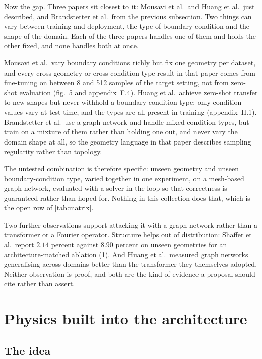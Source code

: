 \documentclass[11pt, a4paper]{article}
\begin{document}
Now the gap. Three papers sit closest to it: Mousavi et al.\ and Huang
et al.\ just described, and Brandstetter et al.\ from the previous
subsection. Two things can vary between training and deployment, the type of
boundary condition and the shape of the domain. Each of the three papers
handles one of them and holds the other fixed, and none handles both at once.

Mousavi et al.\ vary boundary conditions richly but fix one geometry per
dataset, and every cross-geometry or cross-condition-type result in that paper
comes from fine-tuning on between 8 and 512 samples of the target setting, not
from zero-shot evaluation (fig.~5 and appendix~F.4). Huang et al.\ achieve
zero-shot transfer to new shapes but never withhold a boundary-condition type;
only condition values vary at test time, and the types are all present in
training (appendix~H.1). Brandstetter et al.\ use a graph network and handle
mixed condition types, but train on a mixture of them rather than holding one
out, and never vary the domain shape at all, so the geometry language in that
paper describes sampling regularity rather than topology.

The untested combination is therefore specific: unseen geometry and unseen
boundary-condition type, varied together in one experiment, on a mesh-based
graph network, evaluated with a solver in the loop so that correctness is
guaranteed rather than hoped for. Nothing in this collection does that, which
is the open row of \cref{tab:matrix}.

Two further observations support attacking it with a graph network rather than
a transformer or a Fourier operator. Structure helps out of distribution:
Shaffer et al.\ report $2.14$ percent against $8.90$ percent on unseen
geometries for an architecture-matched ablation (\cref{sec:structure}). And
Huang et al.\ measured graph networks generalising across domains better than
the transformer they themselves adopted. Neither observation is proof, and both are the kind of
evidence a proposal should cite rather than assert.

\section{Physics built into the architecture}
\label{sec:structure}

\subsection{The idea}
\end{document}

